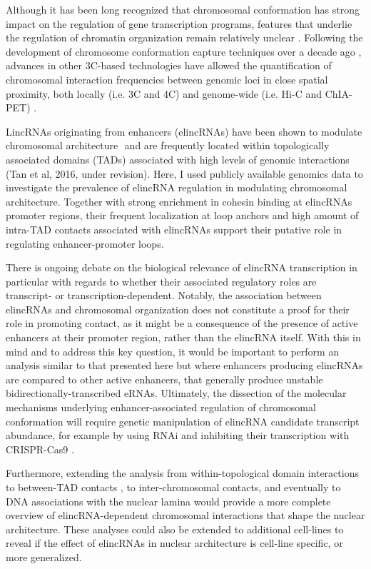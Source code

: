 \documentclass[11pt,a4paper]{report}
\begin{document}
Although it has been long recognized that chromosomal conformation has strong impact on the regulation of gene transcription programs, features that underlie the regulation of chromatin organization remain relatively unclear \cite{Bonev2016}⁠. Following the development of chromosome conformation capture techniques over a decade ago \cite{Dekker2002}⁠, advances in other 3C-based technologies have allowed the quantification of chromosomal interaction frequencies between genomic loci in close spatial proximity, both locally (i.e. 3C and 4C) and genome-wide (i.e. Hi-C and ChIA-PET) \cite{Dekker2013}.

LincRNAs originating from enhancers (elincRNAs) have been shown to modulate chromosomal architecture \cite{Yin2015}⁠ and are frequently located within topologically associated domains (TADs) associated with high levels of genomic interactions (Tan et al, 2016, under revision). Here, I used publicly available genomics data to investigate the prevalence of elincRNA regulation in modulating chromosomal architecture. Together with strong enrichment in cohesin binding at elincRNAs promoter regions, their frequent localization at loop anchors and high amount of intra-TAD contacts associated with elincRNAs support their putative role in regulating enhancer-promoter loops. 

There is ongoing debate on the biological relevance of elincRNA transcription in particular with regards to  whether their associated regulatory roles are transcript- or transcription-dependent. Notably, the association between elincRNAs and chromosomal organization does not constitute a proof for their role in promoting contact, as it might be a consequence of the presence of active enhancers at their promoter region, rather than the elincRNA itself. With this in mind and to address this key question, it would be important to perform an analysis similar to that presented here but where enhancers producing elincRNAs are compared to other active enhancers, that generally produce unstable bidirectionally-transcribed eRNAs. Ultimately, the dissection of the molecular mechanisms underlying enhancer-associated regulation of chromosomal conformation will require genetic manipulation of elincRNA candidate transcript abundance, for example by using RNAi and inhibiting their transcription with CRISPR-Cas9 \cite{Li2013}⁠.

Furthermore, extending the analysis from within-topological domain interactions to between-TAD contacts \cite{Fraser2015}⁠, to inter-chromosomal contacts, and eventually to DNA associations with the nuclear lamina would provide a more complete overview of elincRNA-dependent chromosomal interactions that shape the nuclear architecture. These analyses could also be extended to additional cell-lines to reveal if the effect of elincRNAs in nuclear architecture is cell-line specific, or more generalized. 
\end{document}
